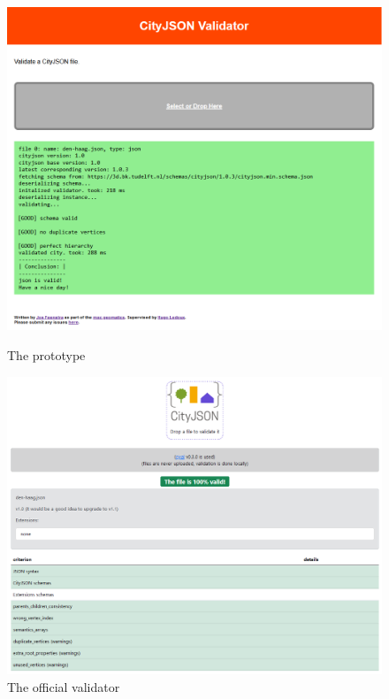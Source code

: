 \begin{figure}[!tbp]
    \centering
    \begin{minipage}[b]{0.45\textwidth}
      \includegraphics[width=\textwidth]{../images/cjval-prototype.PNG}
      \caption{The prototype}
      \label{fig:cjval-prototype}
    \end{minipage}
    \hfill
    \begin{minipage}[b]{0.45\textwidth}
      \includegraphics[width=\textwidth]{../images/cjval-official.PNG}
      \caption{The official validator}
      \label{fig:cjval-official}
    \end{minipage}
\end{figure}

